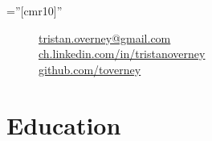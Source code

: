 \documentclass[a4paper,11pt]{article} %
\begin{document}
\pagestyle{empty} %

\font\fb=''[cmr10]'' %



\par{
\bigskip
\par
} %

\begin{figure}
\vspace{-3.5cm}
\footnotesize

\begin{flushright}

\href{mailto:tristan.overney@gmail.com}{tristan.overney@gmail.com} 
\hspace{0.1cm}
\faEnvelope{}
\\ 

\href{https://www.linkedin.com/in/tristanoverney}{ch.linkedin.com/in/tristanoverney}
\hspace{0.1cm}
\faLinkedin{}
\\

\href{https://github.com/toverney}{github.com/toverney}
\hspace{0.1cm} 
\faGithub{}
\\


\end{flushright}

\end{figure}


\section{Education}
\end{document}
